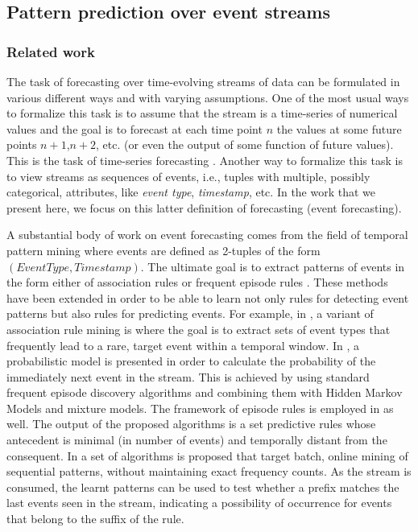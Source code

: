 \subsection{Pattern prediction over event streams}


\subsubsection*{Related work}
The task of forecasting over time-evolving streams of data can be formulated in various different ways and with varying assumptions.
One of the most usual ways to formalize this task is to assume that the stream is a time-series of numerical values and the goal is to forecast at each time point $n$ the values at some future points $n+1$,$n+2$, etc. (or even the output of some function of future values). 
This is the task of time-series forecasting \cite{montgomery_introduction_2015}.
Another way to formalize this task is to view streams as sequences of events,
i.e., tuples with multiple, possibly categorical, attributes, like \textit{event type}, \textit{timestamp}, etc. 
In the work that we present here, 
we focus on this latter definition of forecasting (event forecasting).  

A substantial body of work on event forecasting comes from the field of temporal pattern mining where events are defined as 2-tuples of the form $(\mathit{EventType},\mathit{Timestamp})$.
The ultimate goal is to extract patterns of events in the form either of association rules \cite{agrawal_mining_1993} or frequent episode rules \cite{mannila_discovery_1997}. 
These methods have been extended in order to be able to learn not only rules for detecting event patterns but also rules for predicting events.
For example, in \cite{vilalta_predicting_2002}, a variant of association rule mining is where the goal is to extract sets of event types that frequently lead to a rare, target event within a temporal window. 
In \cite{laxman_stream_2008}, a probabilistic model is presented
in order to calculate the probability of the immediately next event in the stream. 
This is achieved by using standard frequent episode discovery algorithms and combining them with Hidden Markov Models and mixture models.
The framework of episode rules is employed in \cite{fahed_efficient_2014} as well.
The output of the proposed algorithms is a set predictive rules whose antecedent is minimal (in number of events) and temporally distant from the consequent.
In \cite{zhou_pattern_2015} a set of algorithms is proposed that target batch, online mining of sequential patterns, without maintaining exact frequency counts.
As the stream is consumed, the learnt patterns can be used to test whether a prefix matches the last events seen in the stream, 
indicating a possibility of occurrence for events that belong to the suffix of the rule.

